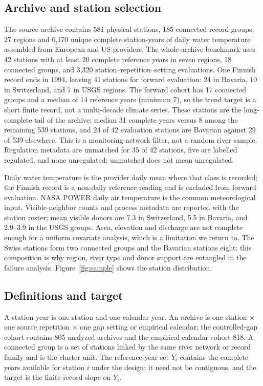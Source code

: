 \subsection{Archive and station selection}

The source archive contains 581 physical stations, 185 connected-record groups, 27 regions and 6,170 unique complete station-years of daily water temperature assembled from European and US providers. The whole-archive benchmark uses 42 stations with at least 20 complete reference years in seven regions, 18 connected groups, and 3,320 station--repetition--setting evaluations. One Finnish record ends in 1994, leaving 41 stations for forward evaluation: 24 in Bavaria, 10 in Switzerland, and 7 in USGS regions. The forward cohort has 17 connected groups and a median of 14 reference years (minimum 7), so the trend target is a short finite record, not a multi-decade climate series. These stations are the long-complete tail of the archive: median 31 complete years versus 8 among the remaining 539 stations, and 24 of 42 evaluation stations are Bavarian against 29 of 539 elsewhere. This is a monitoring-network filter, not a random river sample. Regulation metadata are unmatched for 35 of 42 stations, five are labelled regulated, and none unregulated; unmatched does not mean unregulated.

Daily water temperature is the provider daily mean where that class is recorded; the Finnish record is a non-daily reference reading and is excluded from forward evaluation. NASA POWER daily air temperature is the common meteorological input. Visible-neighbor counts and process metadata are reported with the station roster; mean visible donors are 7.3 in Switzerland, 5.5 in Bavaria, and 2.9--3.9 in the USGS groups. Area, elevation and discharge are not complete enough for a uniform covariate analysis, which is a limitation we return to. The Swiss stations form two connected groups and the Bavarian stations eight; this composition is why region, river type and donor support are entangled in the failure analysis. Figure~\ref{fig:sample} shows the station distribution.

\subsection{Definitions and target}

A station-year is one station and one calendar year. An archive is one station $\times$ one source repetition $\times$ one gap setting or empirical calendar; the controlled-gap cohort contains 805 analyzed archives and the empirical-calendar cohort 818. A connected group is a set of stations linked by the same river network or record family and is the cluster unit. The reference-year set $Y_i$ contains the complete years available for station $i$ under the design; it need not be contiguous, and the target is the finite-record slope on $Y_i$.

